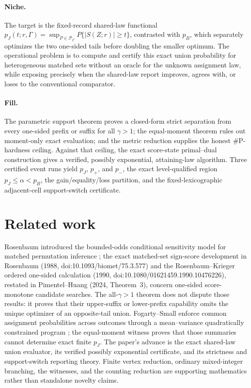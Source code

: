 \documentclass{article}
\begin{document}
\paragraph{Niche.} The target is the fixed-record shared-law functional \(p_J(t;r,\Gamma)=\sup_{P\in\mathcal P_\Gamma}P\{\lvert S(Z;r)\rvert\ge t\}\), contrasted with \(p_B\), which separately optimizes the two one-sided tails before doubling the smaller optimum. The operational problem is to compute and certify this exact union probability for heterogeneous matched sets without an oracle for the unknown assignment law, while exposing precisely when the shared-law report improves, agrees with, or loses to the conventional comparator.

\paragraph{Fill.} The parametric support theorem proves a closed-form strict separation from every one-sided prefix or suffix for all \(\gamma>1\); the equal-moment theorem rules out moment-only exact evaluation; and the metric reduction supplies the honest \(\#\mathrm P\)-hardness ceiling. Against that ceiling, the exact score-state primal--dual construction gives a verified, possibly exponential, attaining-law algorithm. Three certified event runs yield \(p_J\), \(p_+\), and \(p_-\), the exact level-qualified region \(p_J\le\alpha<p_B\), the gain/equality/loss partition, and the fixed-lexicographic adjacent-cell support-switch certificate.

\section{Related work}

Rosenbaum introduced the bounded-odds conditional sensitivity model for matched permutation inference \cite{Rosenbaum1987SensitivityPermutation}; the exact matched-set sign-score development in Rosenbaum (1988, doi:10.1093/biomet/75.3.577) and the Rosenbaum--Krieger ordered one-sided calculation (1990, doi:10.1080/01621459.1990.10476226), restated in Pimentel--Huang (2024, Theorem~3), concern one-sided score-monotone candidate searches. The all-\(\gamma>1\) theorem does not dispute those results: it proves that their upper-suffix or lower-prefix capability omits the unique optimizer of an opposite-tail union. Fogarty--Small enforce common assignment probabilities across outcomes through a mean--variance quadratically constrained program \cite{FogartySmall2016MultipleComparisons}; the equal-moment witness proves that those summaries cannot determine exact finite \(p_J\). The paper's advance is the exact shared-law union evaluator, its verified possibly exponential certificate, and its strictness and support-switch reporting theory. Finite vertex reduction, ordinary mixed-integer branching, the witnesses, and the counting reduction are supporting mathematics rather than standalone novelty claims.
\end{document}
